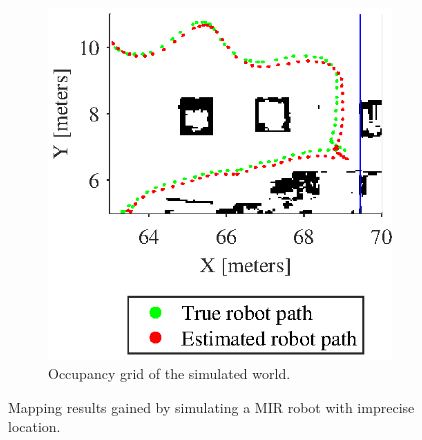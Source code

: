 \begin{figure}
\begin{subfigure}[b]{0.45\textwidth}
			\includegraphics[scale=1.0]{figures/static_mapping/map_region_with_poses}
			\caption{Occupancy grid of the simulated world.}
			\label{fig:map_region_with_poses}
		\end{subfigure}
		\caption{Mapping results gained by simulating a MIR robot with imprecise location.}
		\label{fig:simulated_location_error}
\end{figure}
